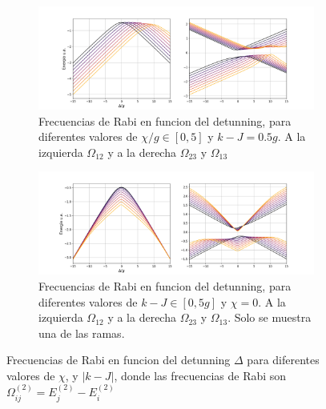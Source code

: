 \begin{figure}
    \centering
    \begin{subfigure}{\textwidth}
        \includegraphics[width=\textwidth]{figuras/ch4/frecuencias k=0.5g chilist.png}
        \caption{Frecuencias de Rabi en funcion del detunning, para diferentes valores de $\chi/g\in[0,5]$ y $k-J=0.5g$. A la izquierda $\Omega_{12}$ y a la derecha $\Omega_{23}$ y $\Omega_{13}$}
        \label{fig4:rabi chi}
    \end{subfigure}
    \vfill
    \begin{subfigure}{\textwidth}
        \includegraphics[width=\textwidth]{figuras/ch4/frecuencias x=0 klist.png}
        \caption{Frecuencias de Rabi en funcion del detunning, para diferentes valores de $k-J\in[0,5g]$ y $\chi=0$. A la izquierda $\Omega_{12}$ y a la derecha $\Omega_{23}$ y $\Omega_{13}$. Solo se muestra una de las ramas.}
        \label{fig4:rabi k}
    \end{subfigure}
    \caption{Frecuencias de Rabi en funcion del detunning $\Delta$ para diferentes valores de $\chi$, y $|k-J|$, donde las frecuencias de Rabi son $\Omega^{(2)}_{ij}=E^{(2)}_{j}-E^{(2)}_{i}$}
    \label{fig4:frecuencias de rabi}
\end{figure}
